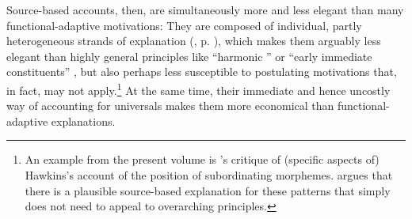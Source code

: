 \documentclass[output=paper]{langsci/langscibook}
\begin{document}
Source-based accounts, then, are simultaneously more and less elegant than many functional-adaptive motivations: They are composed of individual, partly heterogeneous strands of explanation (, p. \pageref{p:cristofaro:strands}), which makes them arguably less elegant than highly general principles like “harmonic ” \citep{Aissen2003} or “early immediate constituents” \citep{Hawkins1994}, but also perhaps less susceptible to postulating motivations that, in fact, may not apply.\footnote{An example from the present volume is ’s critique of (specific aspects of) Hawkins’s  account of the position of subordinating morphemes.  argues that there is a plausible source-based explanation for these patterns that simply does not need to appeal to overarching  principles.} At the same time, their immediate and hence uncostly way of accounting for universals makes them more economical than functional-adaptive explanations. 
\end{document}
